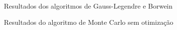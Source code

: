 \documentclass[a4paper]{article}
\begin{document}
\begin{figure}[float=h]
	\begin{center}
	\end{center}
	\caption{Resultados dos algoritmos de Gauss-Legendre e Borwein}
\end{figure}
\begin{figure}[float=h]
	\begin{center}
	\end{center}
	\caption{Resultados do algoritmo de Monte Carlo sem otimização}
\end{figure}
\end{document}
